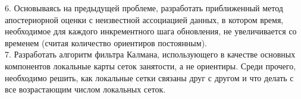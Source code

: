\documentclass[10pt,a4paper]{article}
\begin{document}
6.	Основываясь на предыдущей проблеме, разработать приближенный метод апостериорной оценки с неизвестной ассоциацией данных, в котором время, необходимое для каждого инкрементного шага обновления, не увеличивается со временем (считая количество ориентиров постоянным).\\

7.	Разработать алгоритм фильтра Калмана, использующего в качестве основных компонентов локальные карты сеток занятости, а не ориентиры.  Среди прочего, необходимо решить, как локальные сетки связаны друг с другом и что делать с все возрастающим числом локальных сеток.\\  








 
\end{document}
